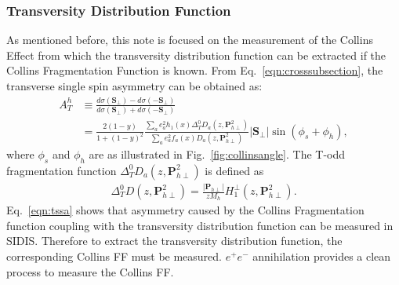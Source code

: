 \subsubsection{Transversity Distribution Function}
As mentioned before, this note is focused on the measurement of the Collins Effect from which the transversity distribution function can be extracted if the Collins Fragmentation Function is known. From Eq.~\eqref{eqn:crosssubsection}, the transverse single spin asymmetry can be obtained \cite{TransversePN} as: 
\begin{equation}
\begin{aligned}
  A^h_T& \equiv \frac{d\sigma(\boldsymbol{S}_{\perp})-d\sigma(-\boldsymbol{S}_{\perp})}{d\sigma(\boldsymbol{S}_{\perp})+d\sigma(-\boldsymbol{S}_{\perp})} \\
  &=\frac{2(1-y)}{1+(1-y)^2}\frac{\sum_ae^2_ah_1(x)\Delta^0_TD_a(z,\boldsymbol{P}^2_{{h\perp}})}{\sum_ae^2_af_a(x)D_a(z,\boldsymbol{P}^2_{{h\perp}})}|\boldsymbol{S}_{\perp}|\sin(\phi_s+\phi_h),
\end{aligned}
\label{eqn:tssa}
\end{equation}
where $\phi_s$ and $\phi_h$ are as illustrated in Fig.~\ref{fig:collinsangle}. The T-odd fragmentation function $\Delta^0_TD_a(z,\boldsymbol{P}^2_{h\perp})$ is defined as 
\begin{equation}
\begin{aligned}
\Delta^0_TD(z,\boldsymbol{P}^2_{h\perp}) = \frac{|\boldsymbol{P}_{h\perp}|}{zM_h}H^{\perp}_1(z,\boldsymbol{P}^2_{h\perp}).
\end{aligned}
\label{eqn:tssa2}
\end{equation}
 Eq.~\eqref{eqn:tssa} shows that asymmetry caused by the Collins Fragmentation function coupling with the transversity distribution function can be measured in SIDIS. Therefore to extract the transversity distribution function, the corresponding Collins FF must be measured. $e^+e^-$ annihilation provides a clean process to measure the Collins FF. 

